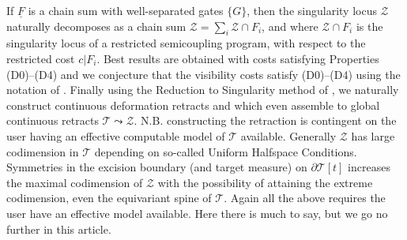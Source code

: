 \documentclass[12pt]{amsart}
\theoremstyle{definition}
\theoremstyle{remark}
\newcommand{\bZ}{\mathbb{Z}}
\newcommand{\del}{\partial}
\newcommand{\uF}{\underline{F}}
\newcommand{\sT}{\mathscr{T}}
\newcommand{\sZ}{\mathscr{Z}}
\begin{document}
If $\uF$ is a chain sum with well-separated gates $\{G\}$, then the singularity locus $\sZ$ naturally decomposes as a chain sum $\sZ=\sum_i \sZ \cap F_i$, and where $\sZ \cap F_i$ is the singularity locus of a restricted semicoupling program, with respect to the restricted cost $c|F_i$. Best results are obtained with costs satisfying Properties (D0)--(D4) and we conjecture that the visibility costs satisfy (D0)--(D4) using the notation of \cite{martel}. Finally using the Reduction to Singularity method of \cite[Theorems 1.4.1-2]{martel}, we naturally construct continuous deformation retracts and which even assemble to global continuous retracts $\sT \leadsto \sZ$. N.B. constructing the retraction is contingent on the user having an effective computable model of $\sT$ available. Generally $\sZ$ has large codimension in $\sT$ depending on so-called Uniform Halfspace Conditions. Symmetries in the excision boundary (and target measure) on $\del \sT[t]$ increases the maximal codimension of $\sZ$ with the possibility of attaining the extreme codimension, even the equivariant spine of $\sT$. Again all the above requires the user have an effective model available. Here there is much to say, but we go no further in this article.






 
\end{document}

